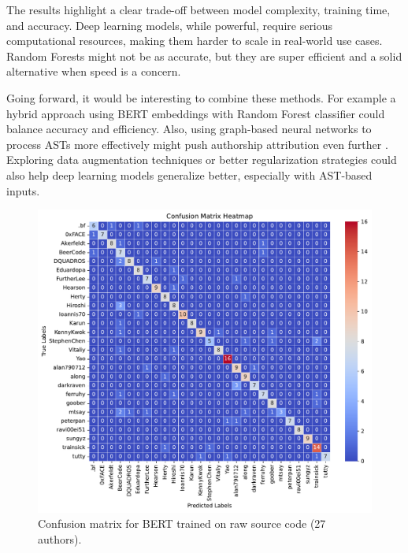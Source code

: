 \documentclass[conference]{IEEEtran}
\begin{document}
The results highlight a clear trade-off between model complexity, training time, and accuracy. Deep learning models, while powerful, 
require serious computational resources, making them harder to scale in real-world use cases. Random Forests might not be as accurate, 
but they are super efficient and a solid alternative when speed is a concern.

Going forward, it would be interesting to combine these methods. For example a hybrid approach using BERT embeddings with Random Forest 
classifier could balance accuracy and efficiency. Also, using graph-based neural networks to process ASTs more effectively might push 
authorship attribution even further \citet{dependence_graphs}. Exploring data augmentation techniques or better regularization strategies could also help deep 
learning models generalize better, especially with AST-based inputs.


\begin{figure}[!t]
    \centering
    \includegraphics[width=\columnwidth]{figures/conf_matrix_sourcode_bert_ts27.pdf}
    \caption{Confusion matrix for BERT trained on raw source code (27 authors).}
    \label{fig:conf_matrix_bert}
\end{figure}
\end{document}

